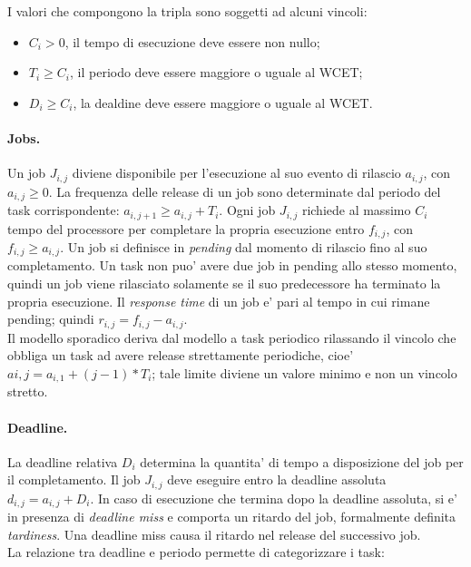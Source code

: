 I valori che compongono la tripla sono soggetti ad alcuni vincoli:\\

\begin{itemize}
	\item $C_i > 0$, il tempo di esecuzione deve essere non nullo;
	\item $T_i \geq C_i$, il periodo deve essere maggiore o uguale al WCET;
	\item $D_i \geq C_i$, la dealdine deve essere maggiore o uguale al WCET.\\
\end{itemize}

\paragraph{Jobs.} Un job $J_{i,j}$ diviene disponibile per l'esecuzione al suo evento di rilascio $a_{i,j}$, con $a_{i,j} \geq 0$. La frequenza delle release di un job sono determinate dal periodo del task corrispondente: $a_{i,j+1} ≥ a_{i,j} + T_i$. Ogni job $J_{i,j}$ richiede al massimo $C_i$ tempo del processore per completare la propria esecuzione entro $f_{i,j}$, con $f_{i,j} \geq a_{i,j}$. Un job si definisce in \textit{pending} dal momento di rilascio fino al suo completamento. Un task non puo' avere due job in pending allo stesso momento, quindi un job viene rilasciato solamente se il suo predecessore ha terminato la propria esecuzione. Il \textit{response time} di un job e' pari al tempo in cui rimane pending; quindi $r_{i,j} = f_{i,j} − a_{i,j}$.\\
Il modello sporadico deriva dal modello a task periodico rilassando il vincolo che obbliga un task ad avere release strettamente periodiche, cioe' $ai,j = a_{i,1} + (j − 1) * T_i$; tale limite diviene un valore minimo e non un vincolo stretto.

\paragraph{Deadline.} La deadline relativa $D_i$ determina la quantita' di tempo a disposizione del job per il completamento. Il job $J_{i,j}$ deve eseguire entro la deadline assoluta $d_{i,j} = a_{i,j} + D_i$. In caso di esecuzione che termina dopo la deadline assoluta, si e' in presenza di \textit{deadline miss} e comporta un ritardo del job, formalmente definita \textit{tardiness}. Una deadline miss causa il ritardo nel release del successivo job.\\
La relazione tra deadline e periodo permette di categorizzare i task:

